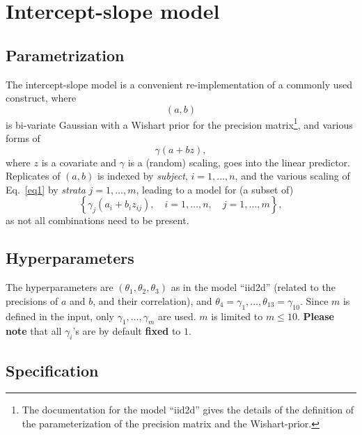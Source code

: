 \documentclass[a4paper,11pt]{article}
\begin{document}
\section*{Intercept-slope model}

\subsection*{Parametrization}

The intercept-slope model is a convenient re-implementation of a
commonly used construct, where
\begin{displaymath}
    (a,b)
\end{displaymath}
is bi-variate Gaussian with a Wishart prior for the precision
matrix\footnote{The documentation for the model ``iid2d'' gives the
    details of the definition of the parameterization of the precision
    matrix and the Wishart-prior.}, and various forms of
\begin{equation}\label{eq1}%
    \gamma(a + bz),
\end{equation}
where $z$ is a covariate and $\gamma$ is a (random) scaling, goes into
the linear predictor. Replicates of $(a,b)$ is indexed by
\emph{subject}, $i=1, \ldots, n$, and the various scaling of
Eq.~\ref{eq1} by \emph{strata} $j=1, \ldots, m$, leading to a model
for (a subset of)
\begin{displaymath}
    \left\{\gamma_j(a_i + b_i z_{ij}), \quad i=1, \ldots,n, \quad j=1,\ldots,m\right\},
\end{displaymath}
as not all combinations need to be present.

\subsection*{Hyperparameters}

The hyperparameters are $(\theta_1,\theta_2,\theta_3)$ as in the model
``iid2d'' (related to the precisions of $a$ and $b$, and their
correlation), and
$\theta_4=\gamma_1, \ldots, \theta_{13}=\gamma_{10}$. Since $m$ is
defined in the input, only $\gamma_1, \ldots, \gamma_m$ are used. $m$
is limited to $m \le 10$. \textbf{Please note} that all $\gamma_i$'s
are by default \textbf{fixed} to $1$.


\subsection*{Specification}
\end{document}
